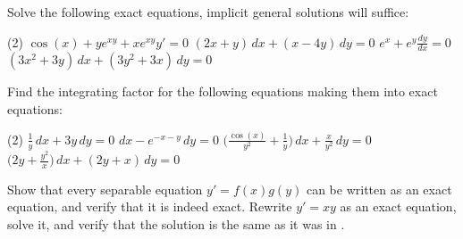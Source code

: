 \setcounter{exercise}{100}

\begin{exercise}
Solve the following exact equations, implicit general solutions
will suffice:
\begin{tasks}(2)
\task
$\cos(x)+ye^{xy} + xe^{xy} y' = 0$
\task
$(2x+y)\, dx + (x-4y) \, dy = 0$
\task
$e^x + e^y \frac{dy}{dx} = 0$
\task
$(3x^2+3y)\,dx + (3y^2+3x)\, dy = 0$
\end{tasks}
\end{exercise}

\begin{samepage}
\begin{exercise}
Find the integrating factor for the following equations making them into
exact equations:
\begin{tasks}(2)
\task
$\frac{1}{y}\, dx + 3y \, dy = 0$
\task
$dx - e^{-x-y} \, dy = 0$
\task
$\bigl( \frac{\cos(x)}{y^2} + \frac{1}{y} \bigr) \, dx + \frac{x}{y^2} \, dy = 0$
\task
$\bigl( 2y + \frac{y^2}{x} \bigr) \, dx + ( 2y+x )\, dy = 0$
\end{tasks}
\end{exercise}
\end{samepage}

\begin{exercise}
\leavevmode
\begin{tasks}
\task
Show that every
separable equation $y' = f(x)g(y)$ can be written as an exact equation,
and verify that it is indeed exact.
\task Rewrite $y' = xy$ as an exact equation, solve it, and verify
that the solution is the same as it was in .
\end{tasks}
\end{exercise}


